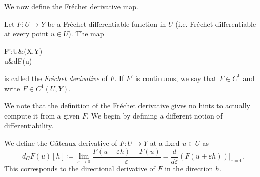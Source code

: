 We now define the Fréchet derivative map.
\begin{definition}
    Let $F:U\to Y$ be a Fréchet differentiable function in $U$ (i.e. Fréchet differentiable at every point $u\in U$). The map
    \begin{tightalign*}
        F':U&\to {}(X,Y)\\
        u&\mapsto dF(u)
    \end{tightalign*}
    is called the \emph{Fréchet derivative} of $F$. If $F'$ is continuous, we say that $F\in C^1$ and write $F\in C^1(U,Y)$.
\end{definition}

We note that the definition of the Fréchet derivative gives no hints to actually compute it from a given $F$. We begin by defining a different notion of differentiability.
\begin{definition}
    We define the Gâteaux derivative of $F:U\to Y$ at a fixed $u\in U$ as
    \begin{equation*}
        d_G F(u)[h] \coloneqq \lim_{\varepsilon\to 0} \frac{F(u+\varepsilon h)-F(u)}{\varepsilon} = \frac{d}{d\varepsilon}\left.\left(F(u+\varepsilon h)\right)\right|_{\varepsilon = 0}.
    \end{equation*}
    This corresponds to the directional derivative of $F$ in the direction $h$.
\end{definition}

